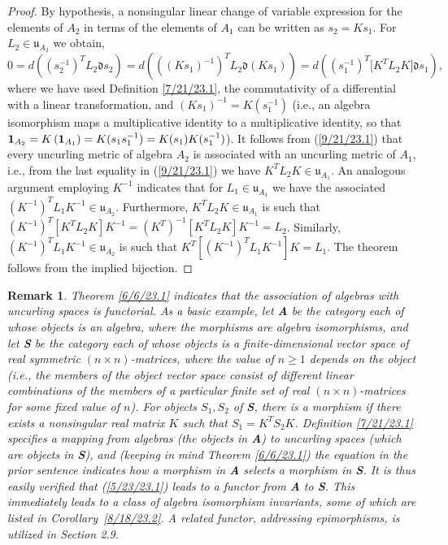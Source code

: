\documentclass{amsart}
\numberwithin{equation}{section}
\newtheorem{remark}[theorem]{Remark}
\theoremstyle{definition}
\numberwithin{theorem}{section}
\begin{document}
\begin{proof} By hypothesis, a nonsingular linear change of variable expression for the elements of $A_2$ in terms of the elements of $A_1$ can be written as $s_2= Ks_1$. \mbox{For $L_2\in \mathfrak{u}_{A_2}$} we obtain, \begin{equation} 0 = d\left((s_2^{-1})^T L_2 \mathfrak{d}s_2\right) =  d\left(((Ks_1)^{-1})^T L_2 \mathfrak{d}(Ks_1)\right) = d\left((s_1^{-1})^T \big[K^T L_2K\big]\mathfrak{d}s_1\right), \label{9/21/23.1}  \end{equation} where we have used Definition \ref{7/21/23.1}, the commutativity of a differential with a linear transformation, and $(Ks_1)^{-1} = K(s_1^{-1})$ (i.e., an algebra isomorphism maps a multiplicative identity to a multiplicative identity, so that ${\bf 1}_{A_2} = K\left(\mathbf{1}_{A_1}\right) = K(s_1s_1^{-1}) = K(s_1)K(s_1^{-1})$).  It follows from (\ref{9/21/23.1}) that every uncurling metric  of algebra $A_2$ is associated with an uncurling metric of $A_1$, i.e., from the last equality in (\ref{9/21/23.1}) we have  $K^TL_2K\in\mathfrak{u}_{A_1}$.  An analogous argument employing $K^{-1}$ indicates that for $L_1\in\mathfrak{u}_{A_1}$ we have the associated $(K^{-1})^T L_1 K^{-1} \in \mathfrak{u}_{A_2}$.    Furthermore, $K^T L_2K\in\mathfrak{u}_{A_1}$ is such that $(K^{-1})^T [K^T L_2 K]K^{-1} = (K^T)^{-1} [K^T L_2 K]K^{-1} = L_2$.  Similarly, $(K^{-1})^T L_1K^{-1}\in\mathfrak{u}_{A_2}$ is such that $K^T[(K^{-1})^T L_1K^{-1}] K = L_1$.  The theorem follows from the implied bijection. 
\end{proof}

\begin{remark} \label{3/31/24.1} {\rm Theorem \ref{6/6/23.1} indicates that the association of algebras with uncurling spaces is functorial.  As a basic example, let {\bf A} be the category each of whose objects is an algebra, where the morphisms are algebra isomorphisms, and let {\bf S} be the category each of whose objects is a finite-dimensional vector space of real symmetric $(n\times n)$-matrices, where the value of $n\ge 1$ depends on the object (i.e., the members of the object vector space consist of different linear combinations of the members of a particular finite set of real $(n\times n)$-matrices for some fixed value of $n$).  For objects $S_1,S_2$ of {\bf S}, there is a morphism if there exists a nonsingular real matrix $K$ such that \mbox{$S_1  = K^T  S_2 K$.}    Definition \ref{7/21/23.1} specifies a mapping from algebras (the objects in {\bf A}) to uncurling spaces (which are objects in {\bf S}), and (keeping in mind Theorem \ref{6/6/23.1}) the equation in the prior sentence indicates how a morphism in {\bf A} selects a morphism in {\bf S}.  It is thus easily verified that (\ref{5/23/23.1}) leads to a functor from {\bf A} to {\bf S}.  This immediately leads to a class of algebra isomorphism invariants, some of which are listed in  \mbox{Corollary \ref{8/18/23.2}}.  A related functor, addressing epimorphisms, is utilized in Section 2.9}. \end{remark}
\end{document}
